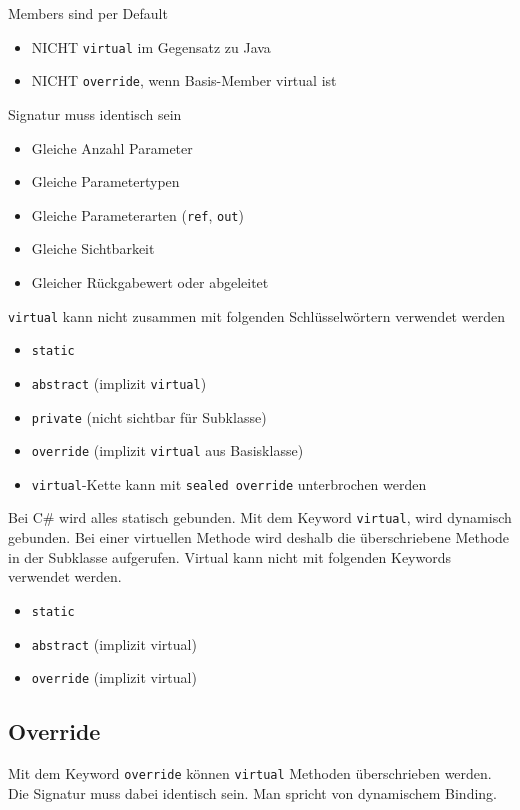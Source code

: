 \documentclass[
a4paper,
oneside,
10pt,
fleqn,
headsepline,
toc=listofnumbered, 
bibliography=totocnumbered]{scrartcl}
\begin{document}
Members sind per Default
\begin{itemize}
    \item NICHT \lstinline|virtual| im Gegensatz zu Java
    \item NICHT \lstinline|override|, wenn Basis-Member virtual ist
\end{itemize}

Signatur muss identisch sein
\begin{itemize}
    \item Gleiche Anzahl Parameter
    \item Gleiche Parametertypen
    \item Gleiche Parameterarten (\lstinline|ref|, \lstinline|out|)
    \item Gleiche Sichtbarkeit
    \item Gleicher Rückgabewert oder abgeleitet
\end{itemize}

\lstinline|virtual| kann nicht zusammen mit folgenden Schlüsselwörtern verwendet werden
\begin{itemize}
    \item \lstinline|static|
    \item \lstinline|abstract| (implizit \lstinline|virtual|)
    \item \lstinline|private| (nicht sichtbar für Subklasse)
    \item \lstinline|override| (implizit \lstinline|virtual| aus Basisklasse)
    \item \lstinline|virtual|-Kette kann mit \lstinline|sealed override| unterbrochen werden
\end{itemize}

Bei C\# wird alles statisch gebunden. Mit dem Keyword \lstinline|virtual|, wird dynamisch gebunden. Bei einer virtuellen Methode wird deshalb die überschriebene Methode in der Subklasse aufgerufen. Virtual kann nicht mit folgenden Keywords verwendet werden.
\begin{itemize}
	\item \lstinline|static|
	\item \lstinline|abstract| (implizit virtual)
	\item \lstinline|override| (implizit virtual)
\end{itemize} 

\subsection{Override}
Mit dem Keyword \lstinline|override| können \lstinline|virtual| Methoden überschrieben werden. Die Signatur muss dabei identisch sein. Man spricht von dynamischem Binding.
\end{document}
